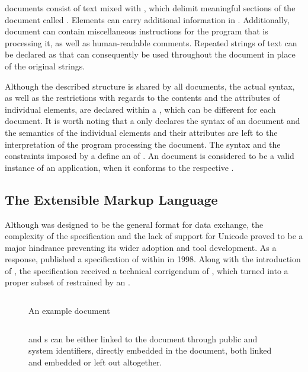 \documentclass{book}
\begin{document}
 documents consist of text mixed with 
, which delimit meaningful sections of the document called
 . Elements can carry additional
information in  . Additionally,
 document can contain miscellaneous instructions for the program
that is processing it, as well as human-readable comments. Repeated strings of
text can be declared as   that can
consequently be used throughout the document in place of the original strings.

Although the described structure is shared by all  documents, the
actual syntax, as well as the restrictions with regards to the contents and the
attributes of individual elements, are declared within a , which
can be different for each document. It is worth noting that a  only
declares the syntax of an  document and the semantics of the
individual elements and their attributes are left to the interpretation of the
program processing the document. The syntax and the constraints imposed by a
 define an   of
. An  document is considered to be a valid instance
of an  application, when it conforms to the respective
.

\subsection{The Extensible Markup Language}
Although  was designed to be the general format for data exchange,
the complexity of the specification and the lack of support for Unicode proved
to be a major hindrance preventing its wider adoption and tool development. As a
response,  published a specification of  within
\cite{bray98} in 1998. Along with the introduction of , the
 specification received a technical corrigendum of
\cite{goldfarb97:webSGML}, which turned  into a proper subset of
 restrained by an  .

\begin{figure}
  \inputminted{xml}{examples/02/recipe.xml}
  \caption{An example  document}
  \label{fig:recipe}\bigskip
  \inputminted{dtd}{examples/02/dtdtypes}
  \caption{ and  s can be either linked
    to the document through public and system identifiers, directly embedded in
    the document, both linked and embedded or left out altogether.}
  \label{fig:recipe-dtd}
\end{figure}
        
\end{document}
